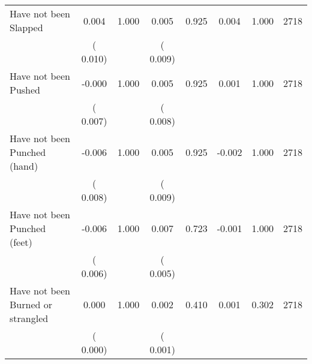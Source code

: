 \begin{tabular}{l*{7}{c}}
 Have not been Slapped       &              0.004       &        1.000  &              0.005       &        0.925  &              0.004       &              1.000 &  2718 \\ 
                       &       (       0.010)             &                               &       (       0.009)                     &                               &                                               &                                &                      \\ 

 Have not been Pushed       &             -0.000       &        1.000  &              0.005       &        0.925  &              0.001       &              1.000 &  2718 \\ 
                       &       (       0.007)             &                               &       (       0.008)                     &                               &                                               &                                &                      \\ 

 Have not been Punched (hand)       &             -0.006       &        1.000  &              0.005       &        0.925  &             -0.002       &              1.000 &  2718 \\ 
                       &       (       0.008)             &                               &       (       0.009)                     &                               &                                               &                                &                      \\ 

 Have not been Punched (feet)       &             -0.006       &        1.000  &              0.007       &        0.723  &             -0.001       &              1.000 &  2718 \\ 
                       &       (       0.006)             &                               &       (       0.005)                     &                               &                                               &                                &                      \\ 

 Have not been Burned or strangled       &              0.000       &        1.000  &              0.002       &        0.410  &              0.001       &              0.302 &  2718 \\ 
                       &       (       0.000)             &                               &       (       0.001)                     &                               &                                               &                                &                      \\ 


\end{tabular}
